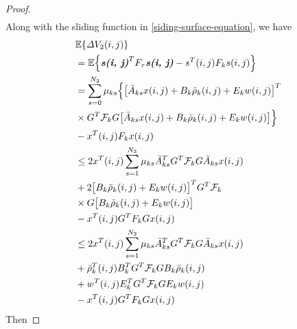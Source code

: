 \documentclass[conference]{IEEEtran}
\begin{document}
\begin{proof}
\begin{equation}
\begin{split}
		\end{split}
	\end{equation}
	Along with the sliding function in \eqref{siding-surface-equation}, we have
	\begin{equation}
		\begin{split}
			&\mathbb{E}\{\varDelta V_{2}(i,j) \}\\
			&=\mathbb{E}\Big\{\emph{\textbf{s(i, j)}}^{T}F_{\tau}\emph{\textbf{s(i, j)}} - s^{T}(i,j)F_{k}s(i,j)\Big\}\\
			&=  \sum_{s=0}^{N_{2}}\mu_{ks}\Big\{\big[\bar{A}_{ks}x(i,j)+B_{k}\bar{\rho}_{k}(i,j)+E_{k}w(i,j)\big]^{T}\\
			&\times G^{T}\mathcal{F}_{k} G\big[ \bar{A}_{ks}x(i,j)+B_{k}\bar{\rho}_{k}(i,j)+E_{k}w(i,j)\big]\Big\}\\
			&-x^{T}(i,j)F_{k}x(i,j)\\
			&\leq 2x^{T}(i,j)\sum_{s=1}^{N_{2}}\mu_{ks}\bar{A}^{T}_{ks}G^{T}\mathcal{F}_{k}G\bar{A}_{ks}x(i,j) \\
			&+2\big[B_{k}\bar{\rho}_{k}(i,j)+E_{k}w(i,j)\big]^{T}G^{T}\mathcal{F}_{k}\\
			&\times G\big[B_{k}\bar{\rho}_{k}(i,j)+E_{k}w(i,j)\big]\\
			&-x^{T}(i,j)G^{T}F_{k}Gx(i,j)\\
			&\leq 2x^{T}(i,j)\sum_{s=1}^{N_{2}}\mu_{ks}\bar{A}^{T}_{ks}G^{T}\mathcal{F}_{k}G\bar{A}_{ks}x(i,j) \\
			&+ \bar{\rho}^{T}_{k}(i,j)B^{T}_{k}G^{T}\mathcal{F}_{k}GB_{k}\bar{\rho}_{k}(i,j)\\
			&+w^{T}(i,j)E^{T}_{k}G^{T}\mathcal{F}_{k}GE_{k}w(i,j)\\
			&-x^{T}(i,j)G^{T}F_{k}Gx(i,j)
		\end{split}
	\end{equation}
	Then 
	  
	  
\end{proof}
\end{document}
